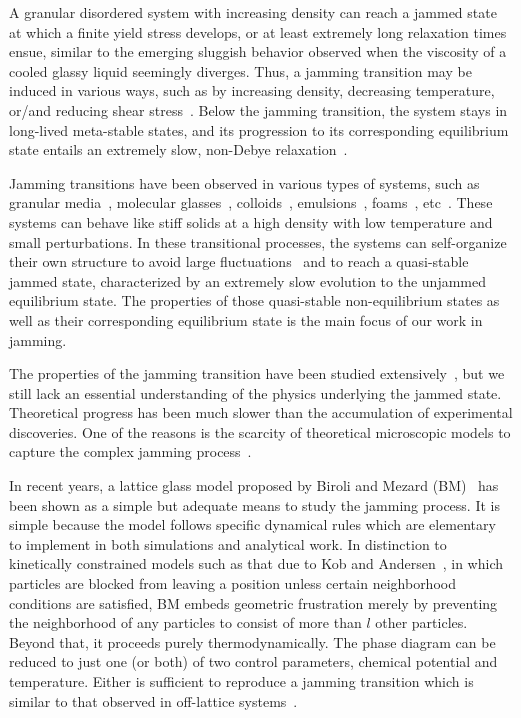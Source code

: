 A granular disordered system with increasing density can reach a jammed state at which a finite yield stress develops, or at least extremely long relaxation times
ensue, similar to the emerging sluggish behavior observed when the
viscosity of a cooled glassy liquid seemingly diverges. Thus, a jamming
transition may be induced in various ways, such as by increasing density,
decreasing temperature, or/and reducing shear stress~\cite{Liu2010}.
Below the jamming transition, the system stays in long-lived meta-stable
states, and its progression to its corresponding equilibrium state
entails an extremely slow, non-Debye relaxation~\cite{Hill1985,Ciamarra2010,van2010}.

Jamming transitions have been observed in various types of systems,
such as granular media~\cite{Majmudar2007}, molecular glasses~\cite{Parisi2010,Angelani2007},
colloids~\cite{Trappe2001}, emulsions~\cite{Zhang2005}, foams~\cite{Berthier2011,DaCruz2002},
etc~\cite{Liu2010,van2010}. These systems can behave like stiff solids
at a high density with low temperature and small perturbations. In
these transitional processes, the systems can self-organize their
own structure to avoid large fluctuations~\cite{Berthier2011} and
to reach a quasi-stable jammed state, characterized by an extremely
slow evolution to the unjammed equilibrium state. The properties of
those quasi-stable non-equilibrium states as well as their corresponding
equilibrium state is the main focus of our work in jamming. 


The properties of the jamming transition have been studied 
extensively~\cite{Biroli2007,Majmudar2007,Liu2010}, but we still lack an essential
understanding of the physics underlying the jammed state. Theoretical
progress has been much slower than the accumulation of experimental
discoveries. One of the reasons is the scarcity of theoretical microscopic
models to capture the complex jamming process~\cite{Krzakala2008,Jacquin2011}. 

In recent years, a lattice glass model proposed by Biroli and Mezard
(BM)~\cite{Biroli02} has been shown as a simple but adequate means
to study the jamming process. It is simple because the model follows
specific dynamical rules which are elementary to implement in both
simulations and analytical work. In distinction to kinetically constrained
models such as that due to Kob and Andersen~\cite{Kob93}, in which
particles are blocked from leaving a position unless certain neighborhood
conditions are satisfied, BM embeds geometric frustration merely by
preventing the neighborhood of any particles to consist of more than
$l$ other particles. Beyond that, it proceeds purely thermodynamically.
The phase diagram can be reduced to just one (or both) of two control
parameters, chemical potential and temperature. Either is sufficient
to reproduce a jamming transition which is similar to that observed
in off-lattice systems~\cite{Biroli02}. 

